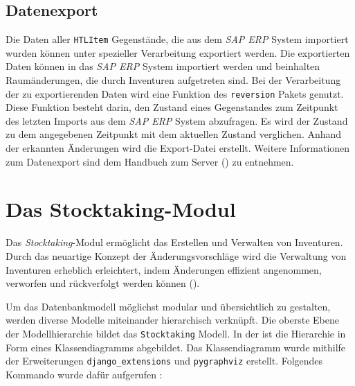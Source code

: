 \hypertarget{datenexport}{%
\subsection{Datenexport}\label{datenexport}}

Die Daten aller \texttt{HTLItem} Gegenstände, die aus dem \emph{SAP ERP}
System importiert wurden können unter spezieller Verarbeitung exportiert
werden. Die exportierten Daten können in das \emph{SAP ERP}
System importiert werden und beinhalten \ua{} Raumänderungen, die durch
Inventuren aufgetreten sind. Bei der Verarbeitung der zu exportierenden
Daten wird eine Funktion des \texttt{reversion} Pakets
\cite{django-reversion-doku} genutzt. Diese Funktion besteht darin, den
Zustand eines Gegenstandes zum Zeitpunkt des letzten Imports aus dem
\emph{SAP ERP}
System abzufragen. Es wird der Zustand zu dem angegebenen Zeitpunkt mit
dem aktuellen Zustand verglichen. Anhand der erkannten Änderungen wird
die Export-Datei erstellt. Weitere Informationen zum Datenexport sind
dem Handbuch zum Server () zu entnehmen.

\hypertarget{das-stocktaking-modul}{%
\section{Das Stocktaking-Modul}\label{das-stocktaking-modul}}

Das \emph{Stocktaking}-Modul ermöglicht das
Erstellen und Verwalten von Inventuren. Durch das neuartige Konzept der
Änderungsvorschläge wird die Verwaltung von Inventuren erheblich
erleichtert, indem Änderungen effizient angenommen, verworfen und
rückverfolgt werden können ().

Um das Datenbankmodell möglichst modular und übersichtlich zu gestalten,
werden diverse Modelle miteinander hierarchisch verknüpft. Die oberste
Ebene der Modellhierarchie bildet das \texttt{Stocktaking} Modell. In
der  ist die Hierarchie in Form
eines Klassendiagramms abgebildet. Das Klassendiagramm wurde mithilfe
der Erweiterungen \texttt{django\_extensions} und \texttt{pygraphviz}
erstellt. Folgendes Kommando wurde dafür aufgerufen
\cite{django-graph-models}:

